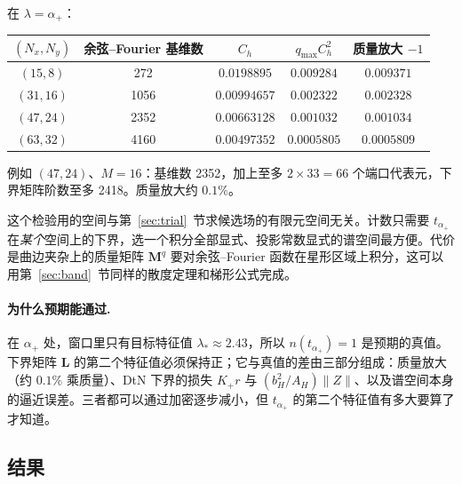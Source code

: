 \documentclass[11pt,a4paper,fontset=fandol]{ctexart}
\begin{document}
在 $\lambda=\alpha_+$：
\begin{center}
\small
\begin{tabular}{ccccc}
\toprule
$(N_x,N_y)$ & 余弦--Fourier 基维数 & $C_h$ & $q_{\max}C_h^2$ & 质量放大 $-1$ \\
\midrule
$(15,8)$ & 272 & $0.0198895$ & $0.009284$ & $0.009371$ \\
$(31,16)$ & 1056 & $0.00994657$ & $0.002322$ & $0.002328$ \\
$(47,24)$ & 2352 & $0.00663128$ & $0.001032$ & $0.001034$ \\
$(63,32)$ & 4160 & $0.00497352$ & $0.0005805$ & $0.0005809$ \\
\bottomrule
\end{tabular}
\end{center}
例如 $(47,24)$、$M=16$：基维数 2352，加上至多 $2\times33=66$ 个端口代表元，下界矩阵阶数至多 2418。质量放大约 $0.1\%$。

\begin{remark}
这个检验用的空间与第~\ref{sec:trial}~节求候选场的有限元空间无关。计数只需要 $t_{\alpha_+}$ 在\emph{某个}空间上的下界，选一个积分全部显式、投影常数显式的谱空间最方便。代价是曲边夹杂上的质量矩阵 $\bm M^q$ 要对余弦--Fourier 函数在星形区域上积分，这可以用第~\ref{sec:band}~节同样的散度定理和梯形公式完成。
\end{remark}

\paragraph{为什么预期能通过.} 在 $\alpha_+$ 处，窗口里只有目标特征值 $\lambda_*\approx2.43$，所以 $n(t_{\alpha_+})=1$ 是预期的真值。下界矩阵 $\bm L$ 的第二个特征值必须保持正；它与真值的差由三部分组成：质量放大（约 $0.1\%$ 乘质量）、DtN 下界的损失 $K_+r$ 与 $(b_H^2/A_H)\|Z\|$、以及谱空间本身的逼近误差。三者都可以通过加密逐步减小，但 $t_{\alpha_+}$ 的第二个特征值有多大要算了才知道。

\subsection{结果}
\end{document}
